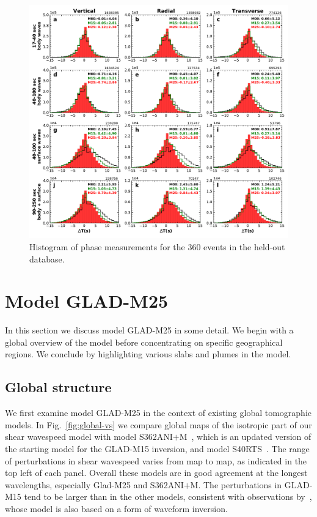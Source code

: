 \documentclass[extra,mreferee]{gji}
\begin{document}
\begin{figure}
  \centering
  \includegraphics[width=\textwidth]{figures/dt_histogram_360.pdf}
  \caption{Histogram of phase measurements for the 360 events in the held-out database.}
  \label{fig:phase_hist_360}
\end{figure}

\section{Model GLAD-M25}

In this section we discuss model GLAD-M25 in some detail.
We begin with a global overview of the model before concentrating on specific geographical regions.
We conclude by highlighting various slabs and plumes in the model.

\subsection{Global structure}

We first examine model GLAD-M25 in the context of existing global tomographic models.
In Fig.~\ref{fig:global-vs} we compare global maps of the isotropic part of our shear wavespeed model with model S362ANI$+$M~\citep{moulik2014anisotropic},
which is an updated version of the starting model for the GLAD-M15 inversion,
and model S40RTS~\citep{ritsema2011s40rts}.
The range of perturbations in shear wavespeed varies from map to map, as indicated in the top left of each panel.
Overall these models are in good agreement at the longest wavelengths, especially Glad-M25 and S362ANI$+$M.
The perturbations in GLAD-M15 tend to be larger than in the other models,
consistent with observations by~\cite{french2014whole},
whose model is also based on a form of waveform inversion.
\end{document}
